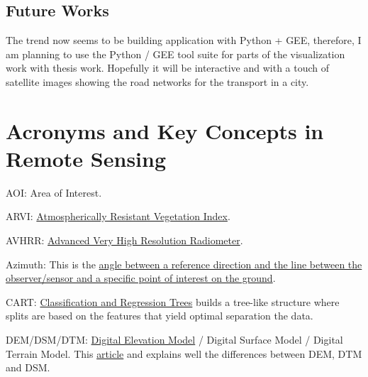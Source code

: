 \documentclass[
  letterpaper,
  DIV=11,
  numbers=noendperiod]{scrreprt}
\begin{document}
\hypertarget{future-works}{%
\section*{Future Works}\label{future-works}}


The trend now seems to be building application with Python + GEE,
therefore, I am planning to use the Python / GEE tool suite for parts of
the visualization work with thesis work. Hopefully it will be
interactive and with a touch of satellite images showing the road
networks for the transport in a city.


\hypertarget{acronyms-and-key-concepts-in-remote-sensing}{%
\chapter*{Acronyms and Key Concepts in Remote
Sensing}\label{acronyms-and-key-concepts-in-remote-sensing}}


AOI: Area of Interest.

ARVI: \protect\hyperlink{week-3-atmosphere-corrections}{Atmospherically
Resistant Vegetation Index}.

AVHRR:
\href{https://en.wikipedia.org/wiki/Advanced_very-high-resolution_radiometer}{Advanced
Very High Resolution Radiometer}.

Azimuth: This is the
\href{https://support.esri.com/en-us/gis-dictionary/azimuth}{angle
between a reference direction and the line between the observer/sensor
and a specific point of interest on the ground}.

CART:
\protect\hyperlink{week-7-classification-with-google-earth-engine-i}{Classification
and Regression Trees} builds a tree-like structure where splits are
based on the features that yield optimal separation the data.

DEM/DSM/DTM:
\href{https://www.usgs.gov/faqs/what-digital-elevation-model-dem}{Digital
Elevation Model} / Digital Surface Model / Digital Terrain Model. This
\href{https://geodetics.com/dem-dsm-dtm-digital-elevation-models/}{article}
and explains well the differences between DEM, DTM and DSM.
\end{document}
